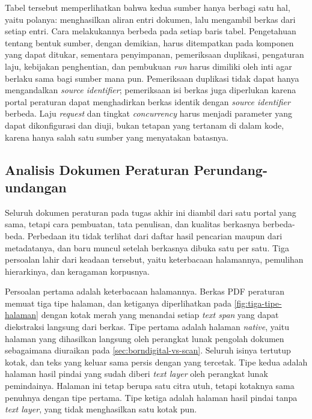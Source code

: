 Tabel tersebut memperlihatkan bahwa kedua sumber hanya berbagi satu hal, yaitu polanya: menghasilkan aliran entri dokumen, lalu mengambil berkas dari setiap entri.
Cara melakukannya berbeda pada setiap baris tabel.
Pengetahuan tentang bentuk sumber, dengan demikian, harus ditempatkan pada komponen yang dapat ditukar, sementara penyimpanan, pemeriksaan duplikasi, pengaturan laju, kebijakan penghentian, dan pembukuan \textit{run} harus dimiliki oleh inti agar berlaku sama bagi sumber mana pun.
Pemeriksaan duplikasi tidak dapat hanya mengandalkan \textit{source identifier}; pemeriksaan isi berkas juga diperlukan karena portal peraturan dapat menghadirkan berkas identik dengan \textit{source identifier} berbeda.
Laju \textit{request} dan tingkat \textit{concurrency} harus menjadi parameter yang dapat dikonfigurasi dan diuji, bukan tetapan yang tertanam di dalam kode, karena hanya salah satu sumber yang menyatakan batasnya.

\subsection{Analisis Dokumen Peraturan Perundang-undangan}
\label{sec:analisis-dokumen-peraturan}

Seluruh dokumen peraturan pada tugas akhir ini diambil dari satu portal yang sama, tetapi cara pembuatan, tata penulisan, dan kualitas berkasnya berbeda-beda.
Perbedaan itu tidak terlihat dari daftar hasil pencarian maupun dari metadatanya, dan baru muncul setelah berkasnya dibuka satu per satu.
Tiga persoalan lahir dari keadaan tersebut, yaitu keterbacaan halamannya, pemulihan hierarkinya, dan keragaman korpusnya.

Persoalan pertama adalah keterbacaan halamannya.
Berkas PDF peraturan memuat tiga tipe halaman, dan ketiganya diperlihatkan pada \autoref{fig:tiga-tipe-halaman} dengan kotak merah yang menandai setiap \textit{text span} yang dapat diekstraksi langsung dari berkas.
Tipe pertama adalah halaman \textit{native}, yaitu halaman yang dihasilkan langsung oleh perangkat lunak pengolah dokumen sebagaimana diuraikan pada \autoref{sec:borndigital-vs-scan}.
Seluruh isinya tertutup kotak, dan teks yang keluar sama persis dengan yang tercetak.
Tipe kedua adalah halaman hasil pindai yang sudah diberi \textit{text layer} oleh perangkat lunak pemindainya.
Halaman ini tetap berupa satu citra utuh, tetapi kotaknya sama penuhnya dengan tipe pertama.
Tipe ketiga adalah halaman hasil pindai tanpa \textit{text layer}, yang tidak menghasilkan satu kotak pun.

